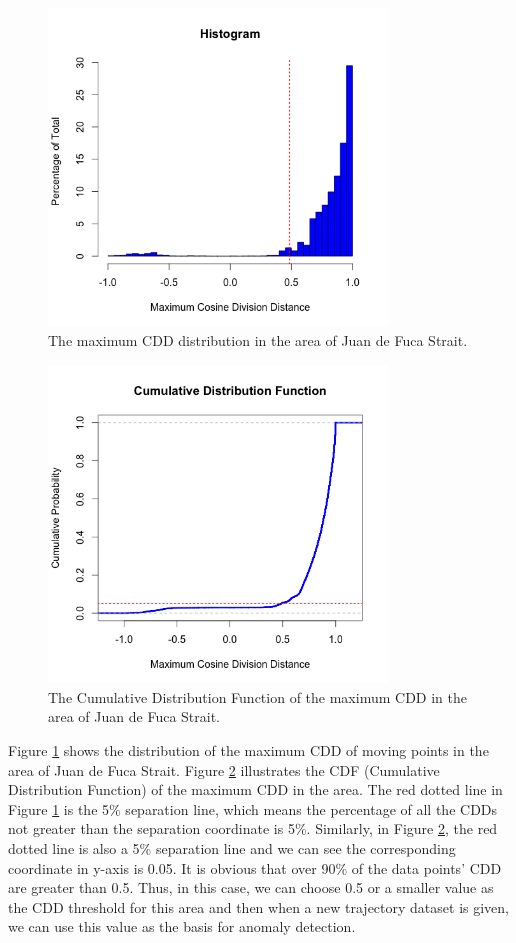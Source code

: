 \documentclass[12pt,glossary]{dalcsthesis}
\begin{document}
\begin{figure}[!hp]
\centering
\includegraphics[width=9cm]{hist.png}
\caption{The maximum CDD distribution in the area of Juan de Fuca Strait.}
\label{fig:maxiCDD}
\end{figure}

\begin{figure}[!hp]
\centering
\includegraphics[width=9cm]{cdf.png}
\caption{The Cumulative Distribution Function of the maximum CDD in the area of Juan de Fuca Strait.}
\label{fig:cdf}
\end{figure}

Figure \ref{fig:maxiCDD} shows the distribution of the maximum CDD of moving points in the area of Juan de Fuca Strait. Figure \ref{fig:cdf} illustrates the CDF (Cumulative Distribution Function) of the maximum CDD in the area. The red dotted line in Figure \ref{fig:maxiCDD} is the 5$\%$ separation line, which means the percentage of all the CDDs not greater than the separation coordinate is 5$\%$. Similarly, in Figure \ref{fig:cdf}, the red dotted line is also a 5$\%$ separation line and we can see the corresponding coordinate in y-axis is 0.05. It is obvious that over 90$\%$ of the data points' CDD are greater than 0.5. Thus, in this case, we can choose 0.5 or a smaller value as the CDD threshold for this area and then when a new trajectory dataset is given, we can use this value as the basis for anomaly detection.
\end{document}
